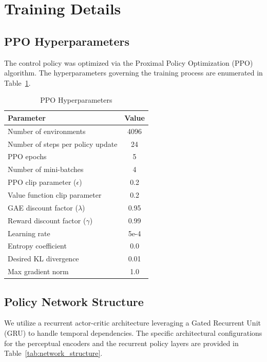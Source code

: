 \clearpage
\appendix
\section{Training Details}

\subsection{PPO Hyperparameters}
The control policy was optimized via the Proximal Policy Optimization (PPO) algorithm. The hyperparameters governing the training process are enumerated in Table~\ref{tab:ppo_params}.

\begin{table}[h!]
\centering
\caption{PPO Hyperparameters}
\label{tab:ppo_params}
\begin{tabular}{lc}
\toprule
\textbf{Parameter} & \textbf{Value} \\
\midrule
Number of environments & 4096 \\
Number of steps per policy update & 24 \\
PPO epochs & 5 \\
Number of mini-batches & 4 \\
PPO clip parameter ($\epsilon$) & 0.2 \\
Value function clip parameter & 0.2 \\
GAE discount factor ($\lambda$) & 0.95 \\
Reward discount factor ($\gamma$) & 0.99 \\
Learning rate & 5e-4 \\
Entropy coefficient & 0.0 \\
Desired KL divergence & 0.01 \\
Max gradient norm & 1.0 \\
\bottomrule
\end{tabular}
\end{table}

\subsection{Policy Network Structure}
We utilize a recurrent actor-critic architecture leveraging a Gated Recurrent Unit (GRU) to handle temporal dependencies. The specific architectural configurations for the perceptual encoders and the recurrent policy layers are provided in Table~\ref{tab:network_structure}.

